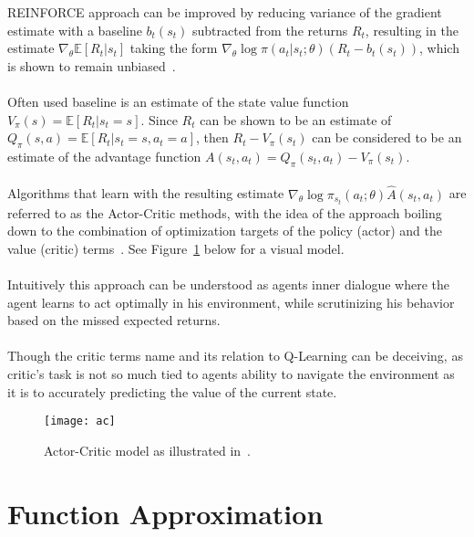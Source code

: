 REINFORCE approach can be improved by reducing variance of the gradient estimate with a baseline $b_t(s_t)$ subtracted from the returns $R_t$, resulting in the estimate $\nabla_{\theta} \mathbb{E}[R_t|s_t]$ taking the form $\nabla_{\theta} \log \pi(a_t|s_t;\theta)(R_t - b_t(s_t))$, which is shown to remain unbiased~\cite{Williams1992}.
\\\\
Often used baseline is an estimate of the state value function $V_\pi(s) = \mathbb{E}[R_t|s_t = s]$. Since $R_t$ can be shown to be an estimate of $Q_\pi(s, a) = \mathbb{E}[R_t|s_t = s, a_t = a]$, then $R_t - V_\pi(s_t)$ can be considered to be an estimate of the advantage function $A(s_t, a_t) = Q_\pi(s_t, a_t) - V_\pi(s_t)$.
\\\\
Algorithms that learn with the resulting estimate $\nabla_{\theta} \log \pi_{s_t}(a_t;\theta)\hat{A}(s_t, a_t)$ are referred to as the Actor-Critic methods, with the idea of the approach boiling down to the combination of optimization targets of the policy (actor) and the value (critic) terms~\cite{Sutton1998}. See Figure~\ref{fig:ac} below for a visual model.
\\\\
Intuitively this approach can be understood as agents inner dialogue where the agent learns to act optimally in his environment, while scrutinizing his behavior based on the missed expected returns.
\\\\
Though the critic terms name and its relation to Q-Learning can be deceiving, as critic’s task is not so much tied to agents ability to navigate the environment as it is to accurately predicting the value of the current state. 

\begin{figure}[ht]
\begin{center}
\texttt{[image: ac]}
\caption{Actor-Critic model as illustrated in~\cite{Sutton1998}.}
\label{fig:ac}
\end{center}
\end{figure}

\section{Function Approximation}

